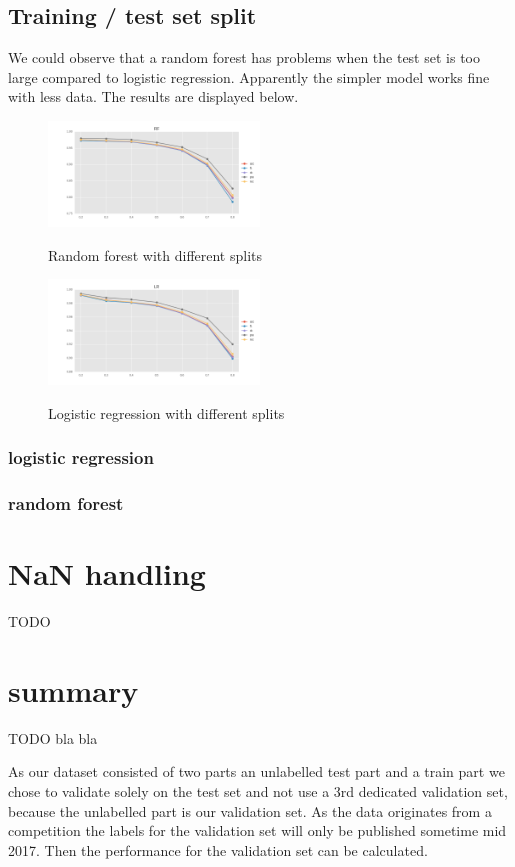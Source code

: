 \documentclass{sig-alternate-05-2015}
\begin{document}
\subsection{Training / test set split}

We could observe that a random forest has problems when the test set is too large compared to logistic regression. Apparently the simpler model works fine with less data.
The results are displayed below.

\begin{figure}[h]
  \centering
  \caption{Random forest with different splits}
  \includegraphics[width=0.5\textwidth]{../plots/RF_split}
  \label{fig:rf_scaling}
\end{figure}


\begin{figure}[h]
  \centering
  \caption{Logistic regression with different splits}
  \includegraphics[width=0.5\textwidth]{../plots/LR_split}
  \label{fig:lr_scaling}
\end{figure}

\subsubsection{logistic regression}

\subsubsection{random forest}

\section{NaN handling}

TODO

\section{summary}

TODO bla bla

As our dataset consisted of two parts an unlabelled test part and a train part we chose to validate solely on the test set and not use a 3rd dedicated validation set, because the unlabelled part is our validation set. As the data originates from a competition the labels for the validation set will only be published sometime mid 2017. Then the performance for the validation set can be calculated.
\end{document}
